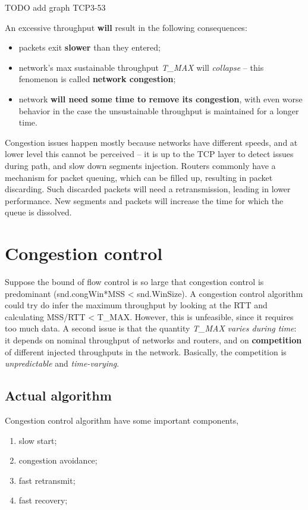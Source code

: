 \documentclass[a4paper, 11pt]{report}
\begin{document}
TODO add graph TCP3-53

An excessive throughput \textbf{will} result in the following consequences:
\begin{itemize}
    \item packets exit \textbf{slower} than they entered;
    \item network's max sustainable throughput \emph{T\_MAX} will
        \emph{collapse} \--- this fenomenon is called \textbf{network
        congestion};
    \item network \textbf{will need some time to remove its congestion},
        with even worse behavior in the case the unsustainable throughput is
        maintained for a longer time.
\end{itemize}

Congestion issues happen mostly because networks have different speeds, and at
lower level this cannot be perceived \--- it is up to the TCP layer to detect
issues during path, and slow down segments injection. Routers commonly have a
mechanism for packet queuing, which can be filled up, resulting in packet
discarding. Such discarded packets will need a retransmission, leading in lower
performance. New segments and packets will increase the time for which the
queue is dissolved.

\section{Congestion control}

Suppose the bound of flow control is so large that congestion control is
predominant (snd.congWin*MSS < snd.WinSize). A congestion control algorithm
could try do infer the maximum throughput by looking at the RTT and calculating
MSS/RTT < T\_MAX. However, this is unfeasible, since it requires too much data.
A second issue is that the quantity \emph{T\_MAX} \emph{varies during time}:
it depends on nominal throughput of networks and routers, and on
\textbf{competition} of different injected throughputs in the network.
Basically, the competition is \emph{unpredictable} and \emph{time-varying}.

\subsection{Actual algorithm}

Congestion control algorithm have some important components,
\begin{enumerate}
	\item slow start;
    \item congestion avoidance;
    \item fast retransmit;
    \item fast recovery;
\end{enumerate}
\end{document}
